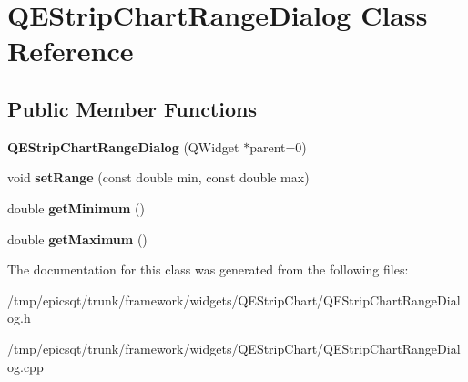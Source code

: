 \hypertarget{classQEStripChartRangeDialog}{
\section{QEStripChartRangeDialog Class Reference}
\label{classQEStripChartRangeDialog}
}
\subsection*{Public Member Functions}
\begin{DoxyCompactItemize}
\item 
\hypertarget{classQEStripChartRangeDialog_aafb0a8cc5eb5035cfcb761de48a0a9de}{
{\bfseries QEStripChartRangeDialog} (QWidget $\ast$parent=0)}
\label{classQEStripChartRangeDialog_aafb0a8cc5eb5035cfcb761de48a0a9de}

\item 
\hypertarget{classQEStripChartRangeDialog_ad480893d890529d98caa42d0735553ab}{
void {\bfseries setRange} (const double min, const double max)}
\label{classQEStripChartRangeDialog_ad480893d890529d98caa42d0735553ab}

\item 
\hypertarget{classQEStripChartRangeDialog_a3400b5eb4a812ef909169c609ad45539}{
double {\bfseries getMinimum} ()}
\label{classQEStripChartRangeDialog_a3400b5eb4a812ef909169c609ad45539}

\item 
\hypertarget{classQEStripChartRangeDialog_a7c3ebbe79282373b163a659b1592e13c}{
double {\bfseries getMaximum} ()}
\label{classQEStripChartRangeDialog_a7c3ebbe79282373b163a659b1592e13c}

\end{DoxyCompactItemize}


The documentation for this class was generated from the following files:\begin{DoxyCompactItemize}
\item 
/tmp/epicsqt/trunk/framework/widgets/QEStripChart/QEStripChartRangeDialog.h\item 
/tmp/epicsqt/trunk/framework/widgets/QEStripChart/QEStripChartRangeDialog.cpp\end{DoxyCompactItemize}
